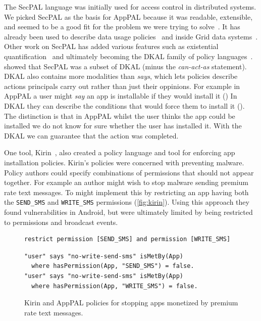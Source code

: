 \documentclass[]{scrartcl}
\begin{document}
The SecPAL language was initially used for access control in distributed systems.
We picked SecPAL as the basis for AppPAL because it was readable, extensible, and seemed to be a good fit for the problem we were trying to solve~\citep{Hallett:2014un}.
It has already been used to describe data usage policies~\citep{Aziz:2011vt} and inside Grid data systems~\cite{Humphrey:2007wc}.
Other work on SecPAL has added various features such as existential quantification~\citep{Becker:2009vt} and ultimately becoming the DKAL family of policy languages~\citep{Gurevich:2008fz,Gurevich:Qo5E3M3}.
\citeauthor{Gurevich:2008fz} showed that SecPAL was a subset of DKAL (minus the \emph{can-act-as} statement).
DKAL also contains more modalities than \emph{says}, which lets policies describe actions principals carry out rather than just their oppinions.
For example in AppPAL a user might \emph{say} an app is installable if they would install it ()
In DKAL they can describe the conditions that would force them to install it ().
The distinction is that in AppPAL whilst the user thinks the app could be installed we do not know for sure whether the user has installed it.
With the DKAL we can guarantee that the action was completed.

One tool, Kirin~\citep{Enck:2009ko}, also created a policy language and tool for enforcing app installation policies.
Kirin's policies were concerned with preventing malware.
Policy authors could specify combinations of permissions that should not appear together.
For example an author might wish to stop malware sending premium rate text messages.
To might implement this by restricting an app having both the \texttt{SEND\_SMS} and \texttt{WRITE\_SMS} permissions (\autoref{fig:kirin}).
Using this approach they found vulnerabilities in Android, but were ultimately limited by being restricted to permissions and broadcast events.
\begin{figure}
\begin{lstlisting}
restrict permission [SEND_SMS] and permission [WRITE_SMS]
\end{lstlisting}
\begin{lstlisting}
"user" says "no-write-send-sms" isMetBy(App)
  where hasPermission(App, "SEND_SMS") = false.
"user" says "no-write-send-sms" isMetBy(App)
  where hasPermission(App, "WRITE_SMS") = false.
\end{lstlisting}
\caption{Kirin and AppPAL policies for stopping apps monetized by premium rate text messages.}
\label{fig:kirin}
\end{figure}
\end{document}
